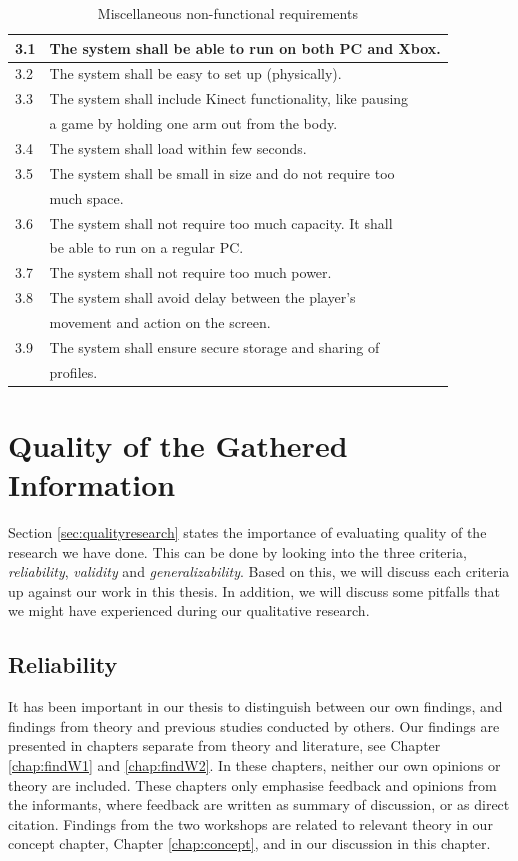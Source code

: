 \begin{table} [H]
\label{tab:nfunc2}
\centering
\begin{tabular}{|l|l|}
\hline
3.1 & The system shall be able to run on both PC and Xbox. \\ \hline
3.2 & The system shall be easy to set up (physically).\\ \hline
3.3 & The system shall include Kinect functionality, like pausing \\ & a game by holding one arm out from the body. \\ \hline
3.4 & The system shall load within few seconds.\\ \hline
3.5 & The system shall be small in size and do not require too \\&  much space.\\ \hline
3.6 & The system shall not require too much capacity. It shall \\ & be able to run on a regular PC. \\ \hline
3.7 & The system shall not require too much power. \\ \hline
3.8 & The system shall avoid delay between the player's \\ & movement and action on the screen.\\ \hline
3.9 & The system shall ensure secure storage and sharing of \\ & profiles. \\ \hline
\end{tabular}
\caption[Miscellaneous non-functional requirements]{Miscellaneous non-functional requirements}
\end{table} 

\section{Quality of the Gathered Information}
\label{sec:discQuality}

Section \ref{sec:qualityresearch} states the importance of evaluating quality of the research we have done. This can be done by looking into the three criteria, \emph{reliability}, \emph{validity} and \emph{generalizability}. Based on this, we will discuss each criteria up against our work in this thesis. In addition, we will discuss some pitfalls that we might have experienced during our qualitative research.  

\subsection{Reliability}
It has been important in our thesis to distinguish between our own findings, and findings from theory and previous studies conducted by others. Our findings are presented in chapters separate from theory and literature, see Chapter \ref{chap:findW1} and \ref{chap:findW2}. In these chapters, neither our own opinions or theory are included. These chapters only emphasise feedback and opinions from the informants, where feedback are written as summary of discussion, or as direct citation. Findings from the two workshops are related to relevant theory in our concept chapter, Chapter \ref{chap:concept}, and in our discussion in this chapter.

